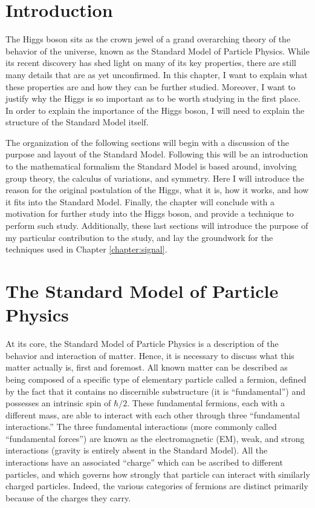 \section{Introduction}

    The Higgs boson sits as the crown jewel of a grand overarching theory of the behavior of the universe,
        known as the Standard Model of Particle Physics.
    While its recent discovery has shed light on many of its key properties,
        there are still many details that are as yet unconfirmed.
    In this chapter, I want to explain what these properties are and how they can be further studied.
    Moreover, I want to justify why the Higgs is so important as to be worth studying in the first place.
    In order to explain the importance of the Higgs boson,
        I will need to explain the structure of the Standard Model itself.

    The organization of the following sections will begin with a discussion of the purpose and layout of the Standard Model.
    Following this will be an introduction to the mathematical formalism the Standard Model is based around,
        involving group theory, the calculus of variations, and symmetry.
    Here I will introduce the reason for the original postulation of the Higgs, what it is, how it works, and how it fits into the Standard Model.
    Finally, the chapter will conclude with a motivation for further study into the Higgs boson, and provide a technique to perform such study.
    Additionally, these last sections will introduce the purpose of my particular contribution to the study,
        and lay the groundwork for the techniques used in Chapter \ref{chapter:signal}.

\section{The Standard Model of Particle Physics}\label{sec:standard_model}
    
    At its core, the Standard Model of Particle Physics is a description of the behavior and interaction of matter.
    Hence, it is necessary to discuss what this matter actually is, first and foremost.
    All known matter can be described as being composed of a specific type of elementary particle called a fermion,
        defined by the fact that it contains no discernible substructure (it is ``fundamental'')
        and possesses an intrinsic spin of $\hbar/2$.
    These fundamental fermions, each with a different mass, are able to interact with each other through three ``fundamental interactions.''
    The three fundamental interactions (more commonly called ``fundamental forces'') are known as
        the electromagnetic (EM), weak, and strong interactions (gravity is entirely absent in the Standard Model).
    All the interactions have an associated ``charge'' which can be ascribed to different particles,
        and which governs how strongly that particle can interact with similarly charged particles.
    Indeed, the various categories of fermions are distinct primarily because of the charges they carry.


